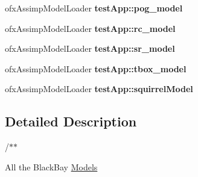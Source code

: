 \begin{DoxyCompactItemize}
\item 
\hypertarget{group___assimp_model_loader_ga28a2622b1304d4096d4fefc1a46759b3}{ofx\-Assimp\-Model\-Loader {\bfseries test\-App\-::pog\-\_\-model}}\label{group___assimp_model_loader_ga28a2622b1304d4096d4fefc1a46759b3}

\item 
\hypertarget{group___assimp_model_loader_ga24711bff00befce43455ad79653d388d}{ofx\-Assimp\-Model\-Loader {\bfseries test\-App\-::rc\-\_\-model}}\label{group___assimp_model_loader_ga24711bff00befce43455ad79653d388d}

\item 
\hypertarget{group___assimp_model_loader_ga74279f23511603111eb4126414556b1b}{ofx\-Assimp\-Model\-Loader {\bfseries test\-App\-::sr\-\_\-model}}\label{group___assimp_model_loader_ga74279f23511603111eb4126414556b1b}

\item 
\hypertarget{group___assimp_model_loader_ga56819e740669b8f1b443bdee23851442}{ofx\-Assimp\-Model\-Loader {\bfseries test\-App\-::tbox\-\_\-model}}\label{group___assimp_model_loader_ga56819e740669b8f1b443bdee23851442}

\item 
\hypertarget{group___assimp_model_loader_ga6319a81becbadfcdd229bf2c98a7f930}{ofx\-Assimp\-Model\-Loader {\bfseries test\-App\-::squirrel\-Model}}\label{group___assimp_model_loader_ga6319a81becbadfcdd229bf2c98a7f930}

\end{DoxyCompactItemize}


\subsection{Detailed Description}
/$\ast$$\ast$
\begin{DoxyItemize}
\item All the Black\-Bay \hyperlink{class_models}{Models} 
\end{DoxyItemize}